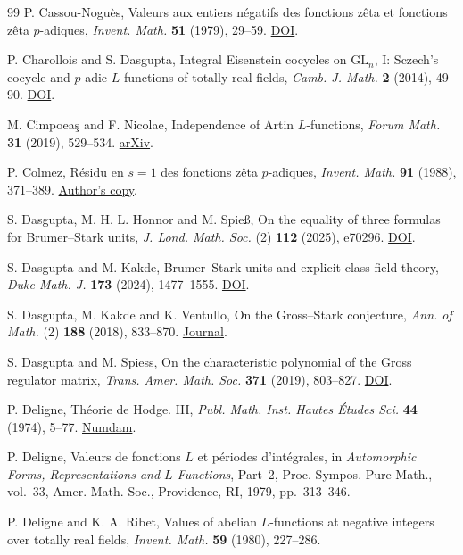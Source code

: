 \documentclass[11pt]{amsart}
\numberwithin{equation}{section}
\theoremstyle{definition}
\theoremstyle{remark}
\begin{document}
\begin{thebibliography}{99}
P. Cassou-Nogu\`es, Valeurs aux entiers n\'egatifs des fonctions
z\^eta et fonctions z\^eta $p$-adiques, \emph{Invent. Math.}
\textbf{51} (1979), 29--59.
\href{https://doi.org/10.1007/BF01389911}{DOI}.

P. Charollois and S. Dasgupta, Integral Eisenstein cocycles on
$\mathrm{GL}_n$, I: Sczech's cocycle and $p$-adic $L$-functions
of totally real fields, \emph{Camb. J. Math.} \textbf{2} (2014), 49--90.
\href{https://doi.org/10.4310/CJM.2014.v2.n1.a2}{DOI}.

M. Cimpoea\c{s} and F. Nicolae, Independence of Artin $L$-functions,
\emph{Forum Math.} \textbf{31} (2019), 529--534.
\href{https://arxiv.org/abs/1805.07990}{arXiv}.

P. Colmez, R\'esidu en $s=1$ des fonctions z\^eta $p$-adiques,
\emph{Invent. Math.} \textbf{91} (1988), 371--389.
\href{https://webusers.imj-prg.fr/~pierre.colmez/residu.pdf}{Author's copy}.

S. Dasgupta, M. H. L. Honnor and M. Spie{\ss}, On the equality of
three formulas for Brumer--Stark units, \emph{J. Lond. Math. Soc.}
(2) \textbf{112} (2025), e70296.
\href{https://doi.org/10.1112/jlms.70296}{DOI}.

S. Dasgupta and M. Kakde, Brumer--Stark units and explicit class
field theory, \emph{Duke Math. J.} \textbf{173} (2024), 1477--1555.
\href{https://doi.org/10.1215/00127094-2023-0039}{DOI}.

S. Dasgupta, M. Kakde and K. Ventullo, On the Gross--Stark conjecture,
\emph{Ann. of Math.} (2) \textbf{188} (2018), 833--870.
\href{https://annals.math.princeton.edu/2018/188-3/p03}{Journal}.

S. Dasgupta and M. Spiess,
On the characteristic polynomial of the Gross regulator matrix,
\emph{Trans. Amer. Math. Soc.} \textbf{371} (2019), 803--827.
\href{https://doi.org/10.1090/tran/7393}{DOI}.

P. Deligne, Th\'eorie de Hodge. III,
\emph{Publ. Math. Inst. Hautes \'Etudes Sci.} \textbf{44} (1974), 5--77.
\href{http://www.numdam.org/item/PMIHES_1974__44__5_0/}{Numdam}.

P. Deligne, Valeurs de fonctions $L$ et p\'eriodes d'int\'egrales,
in \emph{Automorphic Forms, Representations and $L$-Functions},
Part~2, Proc. Sympos. Pure Math., vol.~33, Amer. Math. Soc.,
Providence, RI, 1979, pp.~313--346.

P. Deligne and K. A. Ribet, Values of abelian $L$-functions at
negative integers over totally real fields,
\emph{Invent. Math.} \textbf{59} (1980), 227--286.


\end{thebibliography}
\end{document}
